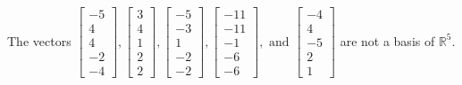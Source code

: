 \begin{exercise}
\begin{exerciseStatement}
  \end{exerciseStatement}
  \begin{exerciseAnswer}
   The vectors \(\left[\begin{array}{r}
-5 \\
4 \\
4 \\
-2 \\
-4
\end{array}\right] , \left[\begin{array}{r}
3 \\
4 \\
1 \\
2 \\
2
\end{array}\right] , \left[\begin{array}{r}
-5 \\
-3 \\
1 \\
-2 \\
-2
\end{array}\right] , \left[\begin{array}{r}
-11 \\
-11 \\
-1 \\
-6 \\
-6
\end{array}\right] , \text{ and } \left[\begin{array}{r}
-4 \\
4 \\
-5 \\
2 \\
1
\end{array}\right]\) 
  	 are not  a basis of \(\mathbb{R}^5\).
  


  \end{exerciseAnswer}
\end{exercise}